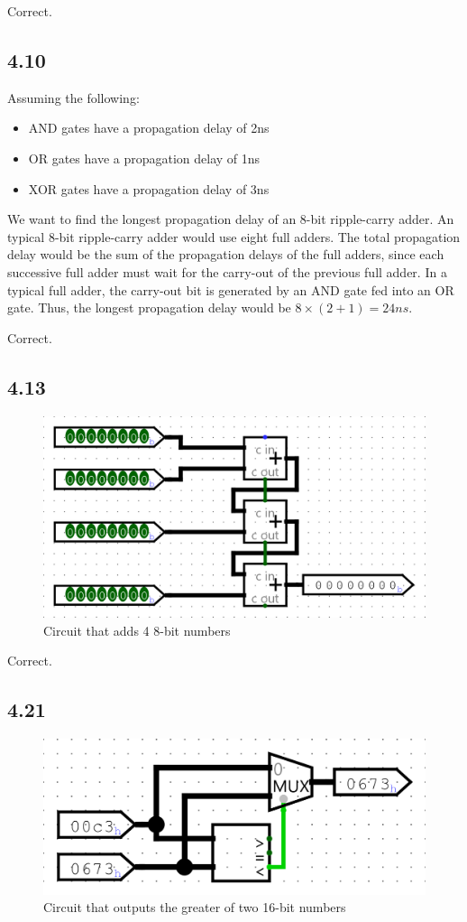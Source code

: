 \documentclass{article}
\begin{document}
\textcolor{mygreen}{Correct.} 

\subsection*{4.10}
Assuming the following:
\begin{itemize}
    \item AND gates have a propagation delay of 2ns
    \item OR gates have a propagation delay of 1ns
    \item XOR gates have a propagation delay of 3ns
\end{itemize}
\noindent We want to find the longest propagation delay of an 8-bit ripple-carry adder.
An typical 8-bit ripple-carry adder would use eight full adders.
The total propagation delay would be the sum of the propagation delays of the full adders, since each successive full adder must wait for the carry-out of the previous full adder.
In a typical full adder, the carry-out bit is generated by an AND gate fed into an OR gate.
Thus, the longest propagation delay would be $8 \times (2 + 1) = 24ns$.

\textcolor{mygreen}{Correct.}

\subsection*{4.13}
\begin{figure}[H]
    \centering
    \includegraphics[width=0.9\linewidth]{./images/4.13.png}
    \caption*{Circuit that adds 4 8-bit numbers}
\end{figure}

\textcolor{mygreen}{Correct.}

\subsection*{4.21}
\begin{figure}[H]
    \centering
    \includegraphics[width=0.9\linewidth]{./images/4.21.png}
    \caption*{Circuit that outputs the greater of two 16-bit numbers}
\end{figure}
\end{document}
